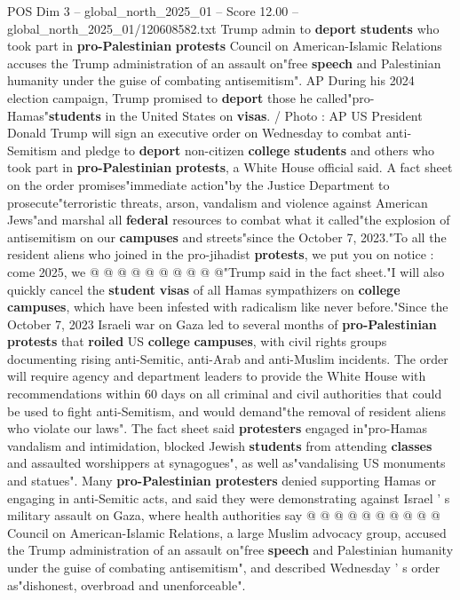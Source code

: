\begin{textsample}{POS Dim 3 – global\_north\_2025\_01 – Score 12.00 – global\_north\_2025\_01/120608582.txt}  \label{ex:f3_pos_267}
Trump admin to \textbf{deport} \textbf{students} who took part in \textbf{pro-Palestinian} \textbf{protests} Council on American-Islamic Relations accuses the Trump administration of an assault on"free \textbf{speech} and Palestinian humanity under the guise of combating antisemitism".
AP During his 2024 election campaign, Trump promised to \textbf{deport} those he called"pro-Hamas"\textbf{students} in the United States on \textbf{visas}. / Photo : AP US President Donald Trump will sign an executive order on Wednesday to combat anti-Semitism and pledge to \textbf{deport} non-citizen \textbf{college} \textbf{students} and others who took part in \textbf{pro-Palestinian} \textbf{protests}, a White House official said.
A fact sheet on the order promises"immediate action"by the Justice Department to prosecute"terroristic threats, arson, vandalism and violence against American Jews"and marshal all \textbf{federal} resources to combat what it called"the explosion of antisemitism on our \textbf{campuses} and streets"since the October 7, 2023."To all the resident aliens who joined in the pro-jihadist \textbf{protests}, we put you on notice : come 2025, we @ @ @ @ @ @ @ @ @ @"Trump said in the fact sheet."I will also quickly cancel the \textbf{student} \textbf{visas} of all Hamas sympathizers on \textbf{college} \textbf{campuses}, which have been infested with radicalism like never before."Since the October 7, 2023 Israeli war on Gaza led to several months of \textbf{pro-Palestinian} \textbf{protests} that \textbf{roiled} US \textbf{college} \textbf{campuses}, with civil rights groups documenting rising anti-Semitic, anti-Arab and anti-Muslim incidents.
The order will require agency and department leaders to provide the White House with recommendations within 60 days on all criminal and civil authorities that could be used to fight anti-Semitism, and would demand"the removal of resident aliens who violate our laws".
The fact sheet said \textbf{protesters} engaged in"pro-Hamas vandalism and intimidation, blocked Jewish \textbf{students} from attending \textbf{classes} and assaulted worshippers at synagogues", as well as"vandalising US monuments and statues".
Many \textbf{pro-Palestinian} \textbf{protesters} denied supporting Hamas or engaging in anti-Semitic acts, and said they were demonstrating against Israel ' s military assault on Gaza, where health authorities say @ @ @ @ @ @ @ @ @ @ Council on American-Islamic Relations, a large Muslim advocacy group, accused the Trump administration of an assault on"free \textbf{speech} and Palestinian humanity under the guise of combating antisemitism", and described Wednesday ' s order as"dishonest, overbroad and unenforceable".

\end{textsample}
